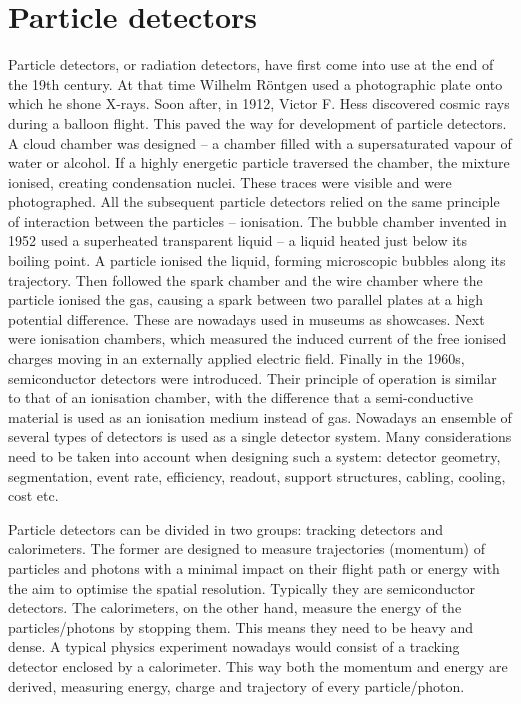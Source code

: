 \section{Particle detectors}
Particle detectors, or radiation detectors, have first come into use at the end of the 19th century. At that time Wilhelm R\"ontgen used a photographic plate onto which he shone X-rays. Soon after, in 1912, Victor F. Hess discovered cosmic rays during a balloon flight. This paved the way for development of particle detectors. A cloud chamber was designed -- a chamber filled with a supersaturated vapour of water or alcohol. If a highly energetic particle traversed the chamber, the mixture ionised, creating condensation nuclei. These traces were visible and were photographed. All the subsequent particle detectors relied on the same principle of interaction between the particles -- ionisation. The bubble chamber invented in 1952 used a superheated transparent liquid -- a liquid heated just below its boiling point. A particle ionised the liquid, forming microscopic bubbles along its trajectory. Then followed the spark chamber and the wire chamber where the particle ionised the gas, causing a spark between two parallel plates at a high potential difference. These are nowadays used in museums as showcases. Next were ionisation chambers, which measured the induced current of the free ionised charges moving in an externally applied electric field. Finally in the 1960s, semiconductor detectors were introduced. Their principle of operation is similar to that of an ionisation chamber, with the difference that a semi-conductive material is used as an ionisation medium instead of gas. Nowadays an ensemble of several types of detectors is used as a single detector system. Many considerations need to be taken into account when designing such a system: detector geometry, segmentation, event rate, efficiency, readout, support structures, cabling, cooling, cost etc.

Particle detectors can be divided in two groups: tracking detectors and calorimeters. The former are designed to measure trajectories (momentum) of particles and photons with a minimal impact on their flight path or energy with the aim to optimise the spatial resolution. Typically they are semiconductor detectors. The calorimeters, on the other hand, measure the energy of the particles/photons by stopping them. This means they need to be heavy and dense. A typical physics experiment nowadays would consist of a tracking detector enclosed by a calorimeter. This way both the momentum and energy are derived, measuring energy, charge and trajectory of every particle/photon.

